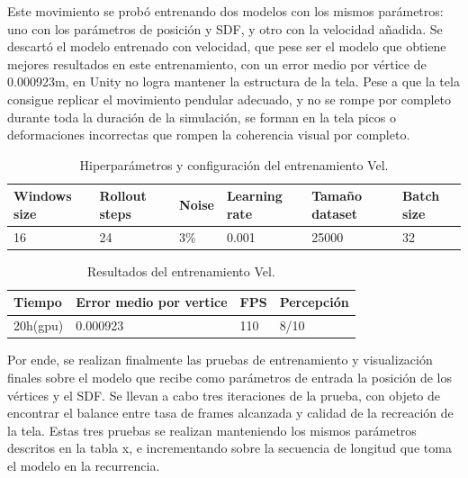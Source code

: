 Este movimiento se probó entrenando dos modelos con los mismos parámetros: uno con los parámetros de posición y SDF, y otro con la velocidad añadida. Se descartó el modelo entrenado con velocidad, que pese ser el modelo que obtiene mejores resultados en este entrenamiento, con un error medio por vértice de 0.000923m, en Unity no logra mantener la estructura de la tela. Pese a que la tela consigue replicar el movimiento pendular adecuado, y no se rompe por completo durante toda la duración de la simulación, se forman en la tela picos o deformaciones incorrectas que rompen la coherencia visual por completo. %

\begin{table}[H]
    \begin{center}
        \begin{tabular}{ | m{2.2cm} | m{2cm} | m{1.2cm} | m{2.1cm} | m{2.4cm} | m{2.2cm} | }
        \hline \textbf{Windows size} & \textbf{Rollout steps} & \textbf{Noise} & \textbf{Learning rate} & \textbf{Tamaño dataset} & \textbf{Batch size} \\ \hline
            16 & 24 & 3\% & 0.001 & 25000 & 32 \\ \hline
        \end{tabular}
            \end{center}
    \caption{Hiperparámetros y configuración del entrenamiento Vel.}
    \label{tab:randomTraining}
\end{table}
        
\begin{table}[H]
    \begin{center}
        \begin{tabular}{ | m{3cm} | m{3cm} | m{1.2cm} | m{2cm} | }
        \hline \textbf{Tiempo} & \textbf{Error medio por vertice} & \textbf{FPS} & \textbf{Percepción} \\ \hline
            20h(gpu) & 0.000923 & 110 & 8/10 \\ \hline
        \end{tabular}
    \end{center}
    \caption{Resultados del entrenamiento Vel.}
    \label{tab:randomResults}
\end{table}

Por ende, se realizan finalmente las pruebas de entrenamiento y visualización finales sobre el modelo que recibe como parámetros de entrada la posición de los vértices y el SDF. Se llevan a cabo tres iteraciones de la prueba, con objeto de encontrar el balance entre tasa de frames alcanzada y calidad de la recreación de la tela. Estas tres pruebas se realizan manteniendo los mismos parámetros descritos en la tabla  x, e incrementando sobre la secuencia de longitud que toma el modelo en la recurrencia. 

